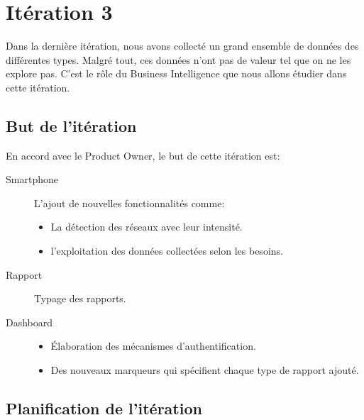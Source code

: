 \chapter{Itération 3}

Dans la dernière itération, nous avons collecté un grand ensemble de données
des différentes types. Malgré tout, ces données n'ont pas de valeur tel que on
ne les explore pas. C'est le rôle du Business Intelligence que nous allons
étudier dans cette itération.

\section{But de l'itération}

En accord avec le Product Owner, le but de cette itération est:

\begin{description}
    \item [Smartphone] L'ajout de nouvelles fonctionnalités comme:
        \begin{itemize}
            \item La détection des réseaux avec leur intensité.
            \item l'exploitation des données collectées selon les besoins.
        \end{itemize}
    \item [Rapport] Typage des rapports.
    \item [Dashboard] \textbf{}

        \begin{itemize}
            \item Élaboration des mécanismes d'authentification.
            \item Des nouveaux marqueurs qui spécifient chaque type de rapport
                ajouté.
        \end{itemize}
\end{description}


\section{Planification de l'itération}


